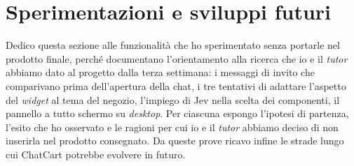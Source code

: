 
\section{Sperimentazioni e sviluppi futuri}
\label{sec:sperimentazioni}

Dedico questa sezione alle funzionalità che ho sperimentato senza portarle nel prodotto finale,
perché documentano l’orientamento alla ricerca che io e il \emph{tutor} abbiamo dato al progetto
dalla terza settimana: i messaggi di invito che comparivano prima dell’apertura della chat, i tre
tentativi di adattare l’aspetto del \emph{widget} al tema del negozio, l’impiego di Jev nella scelta
dei componenti, il pannello a tutto schermo su \emph{desktop}. Per ciascuna espongo l’ipotesi di
partenza, l’esito che ho osservato e le ragioni per cui io e il \emph{tutor} abbiamo deciso di non
inserirla nel prodotto consegnato. Da queste prove ricavo infine le strade lungo cui ChatCart
potrebbe evolvere in futuro.

